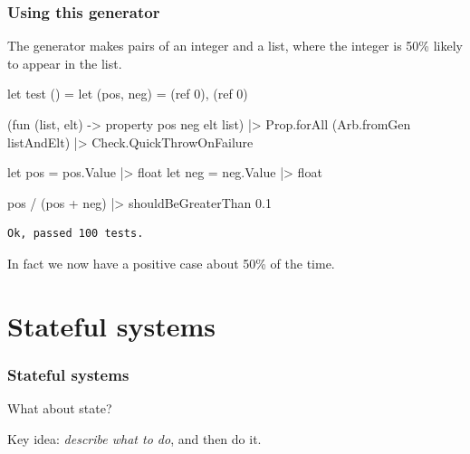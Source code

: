 \documentclass{beamer}
\begin{document}
\begin{frame}[fragile]
\frametitle{Using this generator}

The generator makes pairs of an integer and a list, where the integer is 50\% likely to appear in the list.

\begin{fslisting}
[<Test>]
let test () =
    let (pos, neg) = (ref 0), (ref 0)

    (fun (list, elt) -> property pos neg elt list)
    |> Prop.forAll (Arb.fromGen listAndElt)
    |> Check.QuickThrowOnFailure

    let pos = pos.Value |> float
    let neg = neg.Value |> float

    pos / (pos + neg)
    |> shouldBeGreaterThan 0.1
\end{fslisting}
\end{frame}

\begin{frame}[fragile]
\begin{verbatim}
Ok, passed 100 tests.
\end{verbatim}

In fact we now have a positive case about 50\% of the time.
\end{frame}

\section{Stateful systems}

\begin{frame}
\tableofcontents[currentsection]
\end{frame}

\begin{frame}
\frametitle{Stateful systems}
What about state?

Key idea: \emph{describe what to do}, and then do it.
\end{frame}
\end{document}
